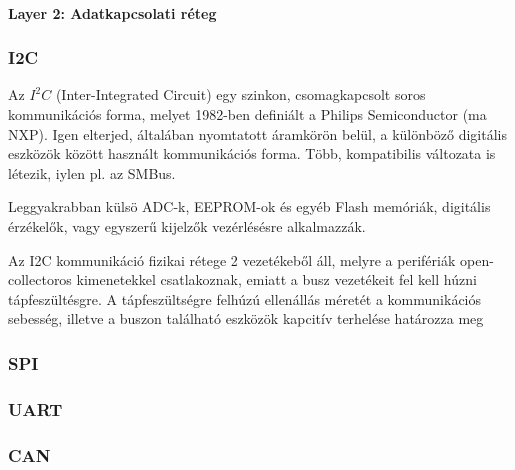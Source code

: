 \paragraph{Layer 2: Adatkapcsolati réteg}



\subsubsection{I2C}

Az $I^2C$ (Inter-Integrated Circuit) egy szinkon, csomagkapcsolt soros kommunikációs forma, melyet 1982-ben definiált a Philips Semiconductor (ma NXP). Igen elterjed, általában nyomtatott áramkörön belül, a különböző digitális eszközök között használt kommunikációs forma. Több, kompatibilis változata is létezik, iylen pl. az SMBus.

Leggyakrabban külsö ADC-k, EEPROM-ok és egyéb Flash memóriák, digitális érzékelők,  vagy egyszerű kijelzők vezérlésésre alkalmazzák.

Az I2C kommunikáció fizikai rétege 2 vezetékeből áll, melyre a perifériák open-collectoros kimenetekkel csatlakoznak, emiatt a busz vezetékeit fel kell húzni tápfeszültésgre. A tápfeszültségre felhúzú ellenállás méretét a kommunikációs sebesség, illetve a buszon található eszközök kapcitív terhelése határozza meg








\subsubsection{SPI}





\subsubsection{UART}








\subsubsection{CAN}













\vspace{-1.5mm}
\newpage
